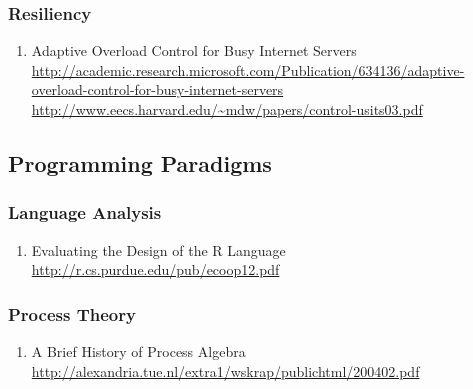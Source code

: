\documentclass{article}
\begin{document}
\subsubsection{Resiliency}


\begin{enumerate}
	\item {Adaptive Overload Control for Busy Internet Servers\\
\href{http://academic.research.microsoft.com/Publication/634136/adaptive-overload-control-for-busy-internet-servers}{http://academic.research.microsoft.com/Publication/634136/adaptive-overload-control-for-busy-internet-servers}\\
\url{http://www.eecs.harvard.edu/~mdw/papers/control-usits03.pdf}}
\end{enumerate}


\subsection{Programming Paradigms}
\subsubsection{Language Analysis}
\begin{enumerate}
	\item {Evaluating the Design of the R Language\\ \url{http://r.cs.purdue.edu/pub/ecoop12.pdf}}
\end{enumerate}
\subsubsection{Process Theory}
\begin{enumerate}
	\item {A Brief History of Process Algebra\\
\url{http://alexandria.tue.nl/extra1/wskrap/publichtml/200402.pdf}}
\end{enumerate}
\end{document}
